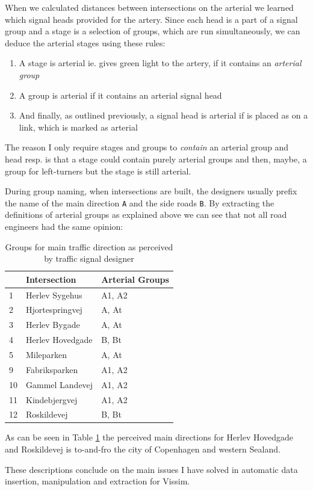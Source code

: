 When we calculated distances between intersections on the arterial we learned which signal heads provided for the artery. Since each head is a part of a signal group and a stage is a selection of groups, which are run simultaneously, we can deduce the arterial stages using these rules:

\begin{enumerate}
\item A stage is arterial ie. gives green light to the artery, if it contains an \textit{arterial group}
\item A group is arterial if it contains an arterial signal head
\item And finally, as outlined previously, a signal head is arterial if is placed as on a link, which is marked as arterial
\end{enumerate}

The reason I only require stages and groups to \textit{contain} an arterial group and head resp. is that a stage could contain purely arterial groups and then, maybe, a group for left-turners but the stage is still arterial.

During group naming, when intersections are built, the designers usually prefix the name of the main direction \verb|A| and the side roads \verb|B|. By extracting the definitions of arterial groups as explained above we can see that not all road engineers had the same opinion:

\begin{table}[!ht]
\centering
\begin{tabular}{l|l|l}
 & \textbf{Intersection} & \textbf{Arterial Groups}\\ \hline
1 & Herlev Sygehus & A1, A2\\
2 & Hjortespringvej & A, At\\
3 & Herlev Bygade & A, At\\
4 & Herlev Hovedgade & B, Bt\\
5 & Mileparken & A, At\\
9 & Fabriksparken & A1, A2\\
10 & Gammel Landevej & A1, A2\\
11 & Kindebjergvej & A1, A2\\
12 & Roskildevej & B, Bt\\
\end{tabular}
\caption{Groups for main traffic direction as perceived by traffic signal designer}
\label{tab:arterial_groups}
\end{table}

As can be seen in Table \ref{tab:arterial_groups} the perceived main directions for Herlev Hovedgade and Roskildevej is to-and-fro the city of Copenhagen and western Sealand.

These descriptions conclude on the main issues I have solved in automatic data insertion, manipulation and extraction for Vissim.